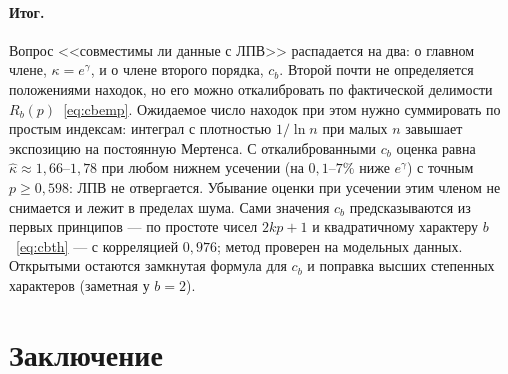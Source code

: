 \documentclass[11pt,a4paper]{article}
\theoremstyle{plain}
\theoremstyle{remark}
\newcommand{\Rb}{R_b}
\newcommand{\eg}{e^{\gamma}}
\begin{document}
\paragraph{Итог.} Вопрос <<совместимы ли данные с ЛПВ>> распадается на два:
о главном члене, $\kappa=\eg$, и о члене второго порядка, $c_b$. Второй почти не
определяется положениями находок, но его можно откалибровать по фактической
делимости $\Rb(p)$~\eqref{eq:cbemp}. Ожидаемое число находок при этом нужно
суммировать по простым индексам: интеграл с плотностью $1/\ln n$ при малых $n$
завышает экспозицию на постоянную Мертенса. С откалиброванными $c_b$ оценка равна
$\hat\kappa\approx1{,}66$--$1{,}78$ при любом нижнем усечении (на $0{,}1$--$7\%$ ниже
$\eg$) с точным $p\ge0{,}598$: ЛПВ не отвергается. Убывание оценки при
усечении этим членом не снимается и лежит в пределах шума. Сами значения $c_b$
предсказываются из первых принципов --- по
простоте чисел $2kp+1$ и квадратичному характеру $b$~\eqref{eq:cbth} --- с
корреляцией $0{,}976$; метод проверен на модельных данных. Открытыми остаются
замкнутая формула для $c_b$ и поправка высших степенных характеров (заметная у
$b=2$).

\section{Заключение}
\end{document}
